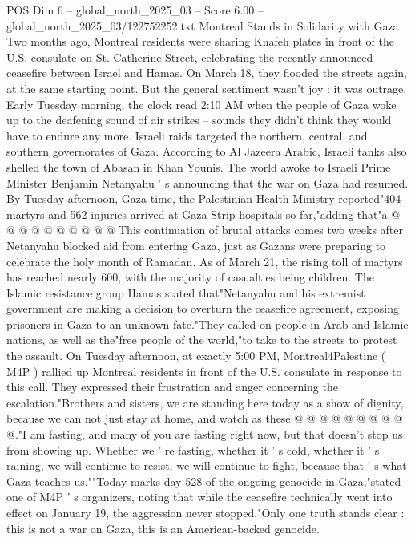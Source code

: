 \begin{textsample}{POS Dim 6 – global\_north\_2025\_03 – Score 6.00 – global\_north\_2025\_03/122752252.txt}  \label{ex:f6_pos_225}
Montreal Stands in Solidarity with Gaza Two months ago, Montreal residents were sharing Knafeh plates in front of the U.S. consulate on St.
Catherine Street, celebrating the recently announced ceasefire between Israel and Hamas.
On March 18, they flooded the streets again, at the same starting point.
But the general sentiment wasn't joy : it was outrage.
Early Tuesday morning, the clock read 2:10 AM when the people of Gaza woke up to the deafening sound of air strikes -- sounds they didn't think they would have to endure any more.
Israeli raids targeted the northern, central, and southern governorates of Gaza.
According to Al Jazeera Arabic, Israeli tanks also shelled the town of Abasan in Khan Younis.
The world awoke to Israeli Prime Minister Benjamin Netanyahu ' s announcing that the war on Gaza had resumed.
By Tuesday afternoon, Gaza time, the Palestinian Health Ministry reported"404 martyrs and 562 injuries arrived at Gaza Strip hospitals so far,"adding that"a @ @ @ @ @ @ @ @ @ @ This continuation of brutal attacks comes two weeks after Netanyahu blocked aid from entering Gaza, just as Gazans were preparing to celebrate the holy month of Ramadan.
As of March 21, the rising toll of martyrs has reached nearly 600, with the majority of casualties being children.
The Islamic resistance group Hamas stated that"Netanyahu and his extremist government are making a decision to overturn the ceasefire agreement, exposing prisoners in Gaza to an unknown fate."They called on people in Arab and Islamic nations, as well as the"free people of the world,"to take to the streets to protest the assault.
On Tuesday afternoon, at exactly 5:00 PM, Montreal4Palestine ( M4P ) rallied up Montreal residents in front of the U.S. consulate in response to this call.
They expressed their frustration and anger concerning the escalation."Brothers and sisters, we are standing here today as a show of dignity, because we can not just stay at home, and watch as these @ @ @ @ @ @ @ @ @ @."I am fasting, and many of you are fasting right now, but that doesn't stop us from showing up.
Whether we ' re fasting, whether it ' s cold, whether it ' s raining, we will continue to resist, we will continue to fight, because that ' s what Gaza teaches us.""Today marks day 528 of the ongoing genocide in Gaza,"stated one of M4P ' s organizers, noting that while the ceasefire technically went into effect on January 19, the aggression never stopped."Only one truth stands clear : this is not a war on Gaza, this is an American-backed genocide.

\end{textsample}
